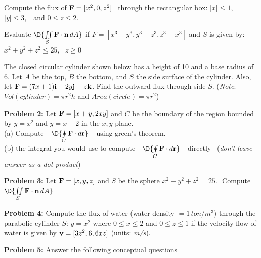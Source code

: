 \documentclass[12pt]{amsart}
\numberwithin{equation}{section}
\begin{document}
\vspace{0.2cm}

Compute the flux of ${\bf F} = [x^2,0,z^2]$ \, through the rectangular box: $|x| \le 1$, \,\, $|y| \le 3$, \,\, and $0 \le z \le 2$.

\vspace{0.2cm}

\EX Evaluate \quad $\D{\iint \limits_{S} {\bf F} \cdot {\bf n} \, dA}$	\quad if $F = [x^3-y^3,y^3-z^3,z^3-x^3]$ and $S$ is given by: $x^2 + y^2 + z^2 \le 25$, \, $z \ge 0$

\vspace{0.2cm}

The closed circular cylinder shown below has a height of 10 and a base radius of 6. Let $A$ be the top, $B$ the bottom, and $S$ the side surface of the cylinder. Also, let ${\bf F} = (7x+1){\bf i} - 2y{\bf j} + z{\bf k}$. Find the outward flux through side $S$.  ({\em Note}:  $Vol(cylinder) = \pi r^2 h$ and $Area(circle) = \pi r^2$)	

\vspace{0.2cm}

{\bf Problem 2:} Let $\text{\bf F} = [x+y,2xy]$ and $C$ be the boundary of the region bounded by $y=x^2$ and $y=x+2$ in the $x,y$-plane. \\
(a) Compute \,\, $\D{\oint \limits_{C} \text{\bf F}\cdot d\text{\bf r}}$ \,\, using green's theorem.\\
(b)  the integral you would use to compute \,\, $\D{\oint \limits_{C} \text{\bf F}\cdot d\text{\bf r}}$ \,\, directly \,\,\,({\em don't leave answer as a dot product})

\vspace{0.2cm}

{\bf Problem 3:} Let $\text{\bf F} = [x,y,z]$ and $S$ be the sphere $x^2+y^2+z^2 = 25$.  \,\,Compute \,$\D{\iint \limits_{S} \text{\bf F}\cdot \text{\bf n} \, dA}$

\vspace{0.2cm}

{\bf Problem 4:} Compute the flux of water (water density $= 1 \, ton/m^3$) through the parabolic cylinder $S:\, y=x^2$ where $0 \le x \le 2$ and $0 \le z \le 1$ if the velocity flow of water is given by $\text{\bf v} = [3z^2, 6, 6xz]$ (units: {\em m/s}).

\vspace{0.2cm}

\newpage 

{\bf Problem 5:} Answer the following conceptual questions
\end{document}
